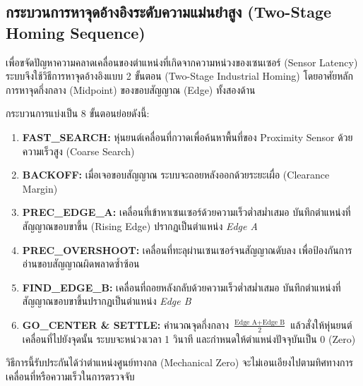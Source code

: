 \subsection{กระบวนการหาจุดอ้างอิงระดับความแม่นยำสูง (Two-Stage Homing Sequence)}
\label{subsec:homing_sequence}

เพื่อขจัดปัญหาความคลาดเคลื่อนของตำแหน่งที่เกิดจากความหน่วงของเซนเซอร์ (Sensor Latency) ระบบจึงใช้วิธีการหาจุดอ้างอิงแบบ 2 ขั้นตอน (Two-Stage Industrial Homing) โดยอาศัยหลักการหาจุดกึ่งกลาง (Midpoint) ของขอบสัญญาณ (Edge) ทั้งสองด้าน


กระบวนการแบ่งเป็น 8 ขั้นตอนย่อยดังนี้:
\begin{enumerate}
    \item \textbf{FAST\_SEARCH:} หุ่นยนต์เคลื่อนที่กวาดเพื่อค้นหาพื้นที่ของ Proximity Sensor ด้วยความเร็วสูง (Coarse Search)
    \item \textbf{BACKOFF:} เมื่อเจอขอบสัญญาณ ระบบจะถอยหลังออกด้วยระยะเผื่อ (Clearance Margin)
    \item \textbf{PREC\_EDGE\_A:} เคลื่อนที่เข้าหาเซนเซอร์ด้วยความเร็วต่ำสม่ำเสมอ บันทึกตำแหน่งที่สัญญาณขอบขาขึ้น (Rising Edge) ปรากฏเป็นตำแหน่ง \textit{Edge A}
    \item \textbf{PREC\_OVERSHOOT:} เคลื่อนที่ทะลุผ่านเซนเซอร์จนสัญญาณดับลง เพื่อป้องกันการอ่านขอบสัญญาณผิดพลาดซ้ำซ้อน
    \item \textbf{FIND\_EDGE\_B:} เคลื่อนที่ถอยหลังกลับด้วยความเร็วต่ำสม่ำเสมอ บันทึกตำแหน่งที่สัญญาณขอบขาขึ้นปรากฏเป็นตำแหน่ง \textit{Edge B}
    \item \textbf{GO\_CENTER \& SETTLE:} คำนวณจุดกึ่งกลาง $\frac{\text{Edge A} + \text{Edge B}}{2}$ แล้วสั่งให้หุ่นยนต์เคลื่อนที่ไปยังจุดนั้น ระบบจะหน่วงเวลา 1 วินาที และกำหนดให้ตำแหน่งปัจจุบันเป็น 0 (Zero) 
\end{enumerate}
วิธีการนี้รับประกันได้ว่าตำแหน่งศูนย์ทางกล (Mechanical Zero) จะไม่เอนเอียงไปตามทิศทางการเคลื่อนที่หรือความเร็วในการตรวจจับ

